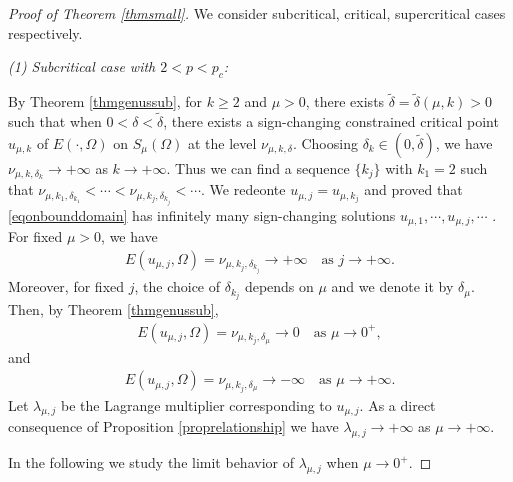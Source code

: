 \documentclass[10pt,a4paper]{article}
\theoremstyle{definition} \theoremstyle{remark}
\numberwithin{equation}{section}
\newcommand{\la}{\lambda}
\begin{document}
\begin{proof}[Proof of Theorem \ref{thmsmall}]
	We consider subcritical, critical, supercritical cases respectively.
	
	\vskip0.1in
	\emph{(1) Subcritical case with $2 < p < p_c$: }
	
	By Theorem \ref{thmgenussub}, for $k \geq 2$ and $\mu > 0$, there exists $\tilde \delta = \tilde \delta(\mu,k) > 0$ such that when $0 < \delta < \tilde \delta$, there exists a sign-changing constrained critical point $u_{\mu,k}$ of $E(\cdot,\Omega)$ on $S_\mu(\Omega)$ at the level $\nu_{\mu,k,\delta}$. Choosing $\delta_k \in (0,\tilde \delta)$, we have $\nu_{\mu,k,\delta_k} \to +\infty$ as $k \to +\infty$. Thus we can find a sequence $\{k_j\}$ with $k_1 = 2$ such that $\nu_{\mu,k_1,\delta_{k_1}} < \cdots < \nu_{\mu,k_j,\delta_{k_j}} < \cdots$. We redeonte $u_{\mu,j} = u_{\mu,k_j}$ and proved that \eqref{eqonbounddomain} has infinitely many sign-changing solutions $u_{\mu,1}, \cdots, u_{\mu,j}, \cdots$ . For fixed $\mu > 0$, we have
	\begin{align*}
		E(u_{\mu,j},\Omega) = \nu_{\mu,k_j,\delta_{k_j}} \to +\infty \quad \text{as } j \to +\infty.
	\end{align*}
	Moreover, for fixed $j$, the choice of $\delta_{k_j}$ depends on $\mu$ and we denote it by $\delta_\mu$. Then, by Theorem \ref{thmgenussub},
	\begin{align*}
		E(u_{\mu,j},\Omega) = \nu_{\mu,k_j,\delta_{\mu}} \to 0 \quad \text{as } \mu \to 0^+,
	\end{align*}
    and
    \begin{align*}
    	E(u_{\mu,j},\Omega) = \nu_{\mu,k_j,\delta_{\mu}} \to -\infty \quad \text{as } \mu \to +\infty.
    \end{align*}
    Let $\la_{\mu,j}$ be the Lagrange multiplier corresponding to $u_{\mu,j}$. As a direct consequence of Proposition \ref{proprelationship} we have $\la_{\mu,j} \to +\infty$ as $\mu \to +\infty$.

    In the following we study the limit behavior of $\la_{\mu,j}$ when $\mu \to 0^+$.


\end{proof}
\end{document}
